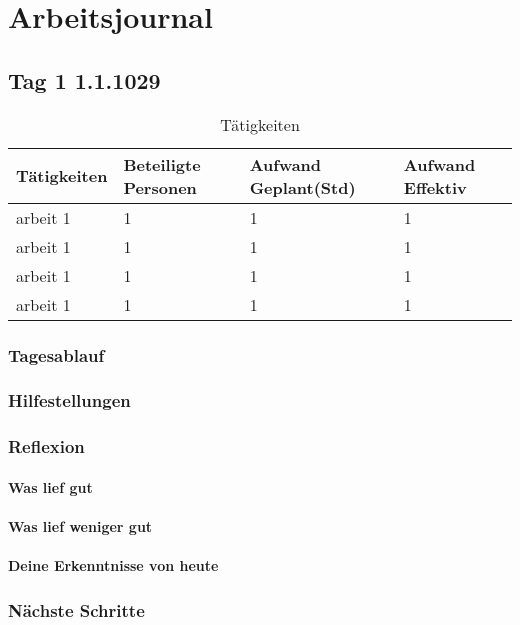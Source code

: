 
\chapter{Arbeitsjournal}
\section{Tag 1 1.1.1029}
\begin{table}[H]
    \begin{tabular}{|L{0.4\textwidth}|C{60pt}|C{60pt}|C{60pt}|}
        \hline
        Tätigkeiten & Beteiligte Personen & Aufwand Geplant(Std) & Aufwand Effektiv \\
        \hline
        arbeit 1 & 1 & 1 & 1 \\
        \hline
        arbeit 1 & 1 & 1 & 1 \\
        \hline
        arbeit 1 & 1 & 1 & 1 \\
        \hline
        arbeit 1 & 1 & 1 & 1 \\
        \hline
    \end{tabular}
    \caption{Tätigkeiten}
\end{table}
\subsection{Tagesablauf}
\lipsum[1-3]
\subsection{Hilfestellungen}
\subsection{Reflexion}
\subsubsection*{Was lief gut}

\subsubsection*{Was lief weniger gut}

\subsubsection*{Deine Erkenntnisse von heute}


\subsection{Nächste Schritte}

